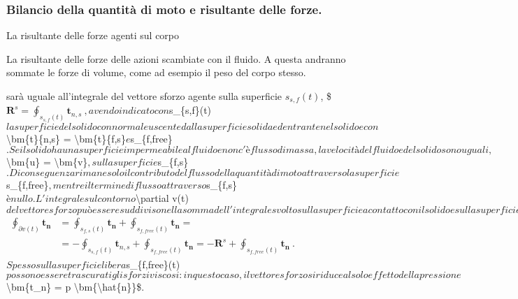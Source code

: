 \documentclass[letterpaper,10pt,italian]{jupyterBook}
\begin{document}
\subsubsection{Bilancio della quantità di moto e risultante delle forze.}
\label{\detokenize{polimi/fluidmechanics-ita/template/capitoli/04_bilanci/0412in:bilancio-della-quantita-di-moto-e-risultante-delle-forze}}
\sphinxAtStartPar
La risultante delle forze agenti sul corpo%
\begin{footnote}[1]\sphinxAtStartFootnote
La risultante delle forze delle azioni scambiate con il fluido. A
questa andranno sommate le forze di volume, come ad esempio il peso
del corpo stesso.
%
\end{footnote} sarà uguale all’integrale
del vettore sforzo agente sulla superficie \(s_{s,f}(t)\),
\$\(\bm{R}^s = \oint_{s_{s,f}(t)} \bm{t}_{n,s} \ ,\)\( avendo indicato con
\)s\_\{s,f\}(t)\( la superficie del solido con normale uscente dalla
superficie solida ed entrante nel solido e con \)\textbackslash{}bm\{t\}\{n,s\} = \sphinxhyphen{} \textbackslash{}bm\{t\}\{f,s\}\( e \)s\_\{f,free\}\(. Se
il solido ha una superficie impermeabile al fluido e non c'è flusso di
massa, la velocità del fluido e del solido sono uguali,
\)\textbackslash{}bm\{u\} = \textbackslash{}bm\{v\}\(, sulla superficie \)s\_\{f,s\}\(. Di conseguenza rimane
solo il contributo del flusso della quantità di moto attraverso la
superficie \)s\_\{f,free\}\(, mentre il termine di flusso attraverso
\)s\_\{f,s\}\( è nullo. L'integrale sul contorno \)\textbackslash{}partial v(t)\( del vettore
sforzo può essere suddiviso nella somma dell'integrale svolto sulla
superficie a contatto con il solido e sulla superficie libera,
\)\(\begin{aligned}
 \oint_{\partial v(t)} \bm{t_n} & = 
 \oint_{s_{f,s}(t)} \bm{t_n} + \oint_{s_{f,free}(t)} \bm{t_n} = \\
 & = - \oint_{s_{s,f}(t)} \bm{t}_{n,s} + \oint_{s_{f,free}(t)} \bm{t_n} =
 -\bm{R}^s + \oint_{s_{f,free}(t)} \bm{t_n} \ .
\end{aligned}\)\( Spesso sulla superficie libera \)s\_\{f,free\}(t)\( possono
essere trascurati gli sforzi viscosi: in questo caso, il vettore sforzo
si riduce al solo effetto della pressione \)\textbackslash{}bm\{t\_n\} = \sphinxhyphen{}p \textbackslash{}bm\{\textbackslash{}hat\{n\}\}\$.
\end{document}
